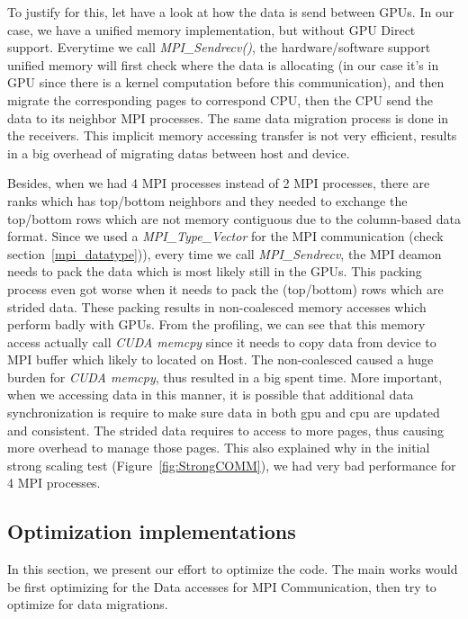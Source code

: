 \documentclass[article]{scrartcl}
\begin{document}
To justify for this, let have a look at how the data is send between GPUs. In our case, we have a unified memory implementation, but without GPU Direct support. Everytime we call \textit{MPI\_Sendrecv()}, the hardware/software support unified memory will first check where the data is allocating (in our case it's in GPU since there is a kernel computation before this communication), and then migrate the corresponding pages to correspond CPU, then the CPU send the data to its neighbor MPI processes. The same data migration process is done in the receivers. This implicit memory accessing transfer is not very efficient, results in a big overhead of migrating datas between host and device.

Besides, when we had 4 MPI processes instead of 2 MPI processes, there are ranks which has top/bottom neighbors and they needed to exchange the top/bottom rows which are not memory contiguous due to the column-based data format. Since we used a \textit{MPI\_Type\_Vector} for the MPI communication (check section~\ref{mpi_datatype})), every time we call \textit{MPI\_Sendrecv}, the MPI deamon needs to pack the data which is most likely still in the GPUs. This packing process even got worse when it needs to pack the (top/bottom) rows which are strided data. These packing results in non-coalesced memory accesses which perform badly with GPUs. From the profiling, we can see that this memory access actually call \textit{CUDA memcpy} since it needs to copy data from device to MPI buffer which likely to located on Host. The  non-coalesced caused a huge burden for \textit{CUDA memcpy}, thus resulted in a big spent time. More important, when we accessing data in this manner, it is possible that additional data synchronization is require to make sure data in both gpu and cpu are updated and consistent. The strided data requires to access to more pages, thus causing more overhead to manage those pages. This also explained why in the initial strong scaling test (Figure~\ref{fig:StrongCOMM}), we had very bad performance for 4 MPI processes.

\subsection{Optimization implementations}
In this section, we present our effort to optimize the code. The main works would be first optimizing for the Data accesses for MPI Communication, then try to optimize for data migrations.
\end{document}

